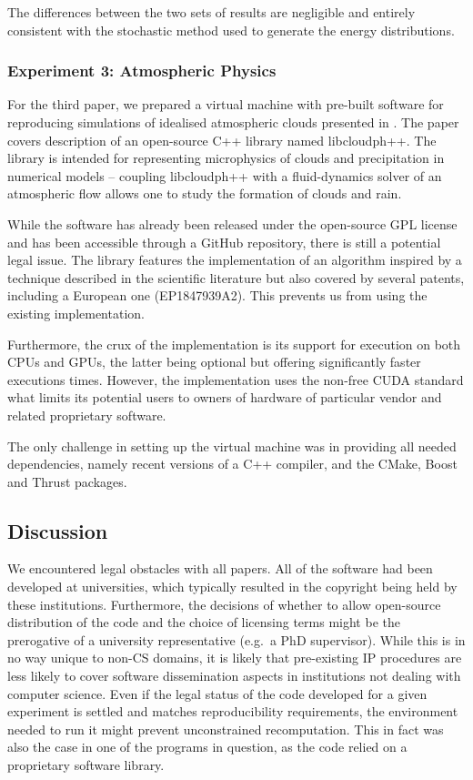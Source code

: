 The differences between the two sets of results are negligible and entirely consistent with the stochastic method used to generate the energy distributions.

\subsubsection*{Experiment 3: Atmospheric Physics}

For the third paper, we prepared a virtual machine with pre-built software for reproducing 
  simulations of idealised atmospheric clouds presented in \cite{arabas2013libcloud}.
The paper covers description of an open-source C++ library named libcloudph++. 
The library is intended for representing microphysics of clouds and precipitation
  in numerical models -- coupling libcloudph++ with a fluid-dynamics solver 
  of an atmospheric flow allows one to study the formation of clouds and rain.

While the software has already been released under the open-source GPL license
  and has been accessible through a GitHub repository, there is still
  a potential legal issue.
The library features the implementation of an algorithm inspired by a technique 
  described in the scientific literature but also covered by several patents,
  including a European one (EP1847939A2). This prevents us from using the
  existing implementation.

Furthermore, the crux of the implementation is its support for execution
  on both CPUs and GPUs, the latter being optional but offering 
  significantly faster executions times.
However, the implementation uses the non-free CUDA standard what limits its potential
  users to owners of hardware of particular vendor and related proprietary software.

The only challenge in setting up the virtual machine was in providing all needed
  dependencies, namely recent versions of a C++ compiler, and the CMake, Boost and Thrust 
  packages.

\subsection{Discussion}

We encountered legal obstacles with all papers.
All of the software had been developed at universities, which typically resulted in the copyright being held by these institutions.
Furthermore, the decisions of whether to allow open-source distribution of the
code and the choice of licensing terms might be the prerogative of a university
representative (e.g.\ a PhD supervisor).
While this is in no way unique to non-CS domains, it is likely that pre-existing IP procedures are less likely to cover software dissemination aspects in institutions not dealing with computer science.
Even if the legal status of the code developed for a given experiment is settled and matches reproducibility requirements, the environment needed to run it might prevent unconstrained recomputation.
This in fact was also the case in one of the programs in question, as the code relied on a proprietary software library.

